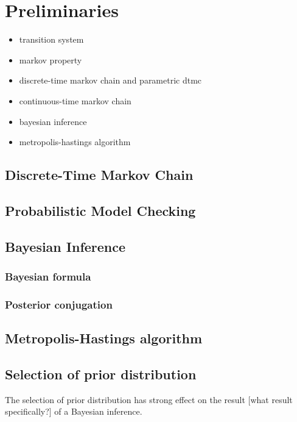 \chapter{Preliminaries}
{\color{red}
  \begin{itemize}
  \item transition system
  \item markov property
  \item discrete-time markov chain and parametric dtmc
  \item continuous-time markov chain
  \item bayesian inference
  \item metropolis-hastings algorithm
  \end{itemize}
}

\section{Discrete-Time Markov Chain}


\section{Probabilistic Model Checking}



\section{Bayesian Inference}

\subsection{Bayesian formula}



\subsection{Posterior conjugation}


\section{Metropolis-Hastings algorithm}

\section{Selection of prior distribution}
The selection of prior distribution has strong effect on the result [what result
specifically?] of a Bayesian inference.